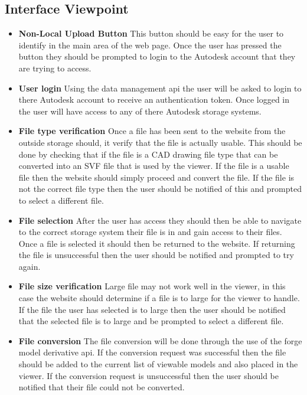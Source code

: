 \documentclass[letterpaper, 10pt, draftclsnofoot, compsoc, onecolumn]{IEEEtran}
\begin{document}
\subsection{Interface Viewpoint}
\begin{itemize}
	\item[]\textbf{Non-Local Upload Button} This button should be easy for the user to identify in the main area of the web page. Once the user has pressed the button they should be prompted to login to the Autodesk account that they are trying to access.
	\item[]\textbf{User login} Using the data management api the user will be asked to login to there Autodesk account to receive an authentication token. Once logged in the user will have access to any of there Autodesk storage systems. 
	\item[]\textbf{File type verification} Once a file has been sent to the website from the outside storage should, it verify that the file is actually usable. This should be done by checking that if the file is a CAD drawing file type that can be converted into an SVF file that is used by the viewer. If the file is a usable file then the 	
	website should simply proceed and convert the file. If the file is not the correct file type then the user should be notified of this and prompted to select a different file.  
	\item[]\textbf{File selection} After the user has access they should then be able to navigate to the correct storage system their file is in and gain access to their files. Once a file is selected it should then be returned to the website. If returning the file is unsuccessful then the user should be notified and prompted to try 
	again.
	\item[]\textbf{File size verification} Large file may not work well in the viewer, in this case the website should determine if a file is to large for the viewer to handle. If the file the user has selected is to large then the user should be 		
	notified that the selected file is to large and be prompted to select a different file.
	\item[]\textbf{File conversion} The file conversion will be done through the use of the forge model derivative api. If the conversion request was successful then the file should be added to the current list of viewable models and also placed in the viewer. If the conversion request is unsuccessful then the user should
	 be notified that their file could not be converted. 
\end{itemize}
  
\end{document}
